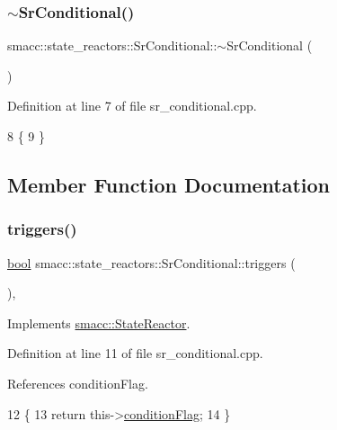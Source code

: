 \subsubsection{\texorpdfstring{$\sim$\+Sr\+Conditional()}{~SrConditional()}}
{\footnotesize\ttfamily smacc\+::state\+\_\+reactors\+::\+Sr\+Conditional\+::$\sim$\+Sr\+Conditional (\begin{DoxyParamCaption}{ }\end{DoxyParamCaption})}



Definition at line 7 of file sr\+\_\+conditional.\+cpp.


\begin{DoxyCode}
8 \{
9 \}
\end{DoxyCode}


\subsection{Member Function Documentation}
\mbox{\label{classsmacc_1_1state__reactors_1_1SrConditional_acbd91c59644957faac4e9d7716513cb4}} 
\subsubsection{\texorpdfstring{triggers()}{triggers()}}
{\footnotesize\ttfamily \hyperlink{classbool}{bool} smacc\+::state\+\_\+reactors\+::\+Sr\+Conditional\+::triggers (\begin{DoxyParamCaption}{ }\end{DoxyParamCaption})\hspace{0.3cm}{\ttfamily [override]}, {\ttfamily [virtual]}}



Implements \hyperlink{classsmacc_1_1StateReactor_a445bc3c90980d75d7d815b85cfb68b21}{smacc\+::\+State\+Reactor}.



Definition at line 11 of file sr\+\_\+conditional.\+cpp.



References condition\+Flag.


\begin{DoxyCode}
12 \{
13     \textcolor{keywordflow}{return} this->\hyperlink{classsmacc_1_1state__reactors_1_1SrConditional_a3642c78c02f02ed8eb0e5a41240f445c}{conditionFlag};
14 \}
\end{DoxyCode}


